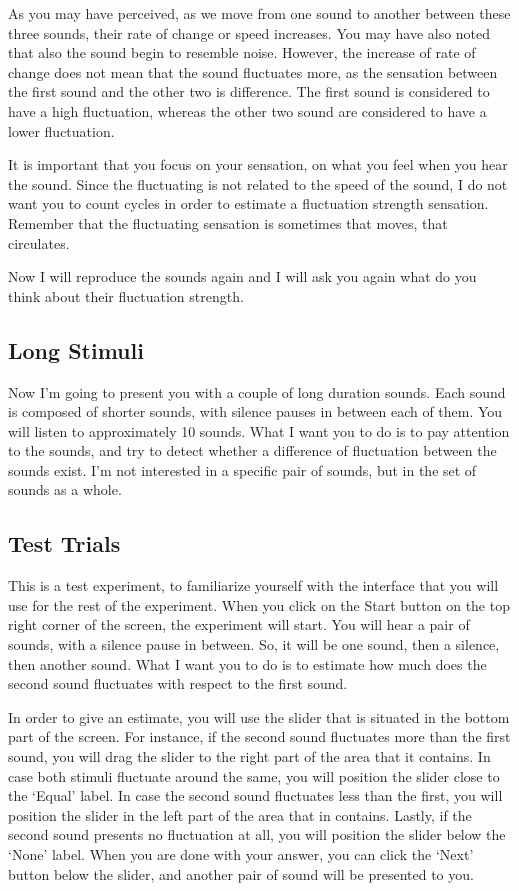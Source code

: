 \documentclass[../main.tex]{subfiles}
\begin{document}
As you may have perceived, as we move from one sound to another between these
three sounds, their rate of change or speed increases. You may have also noted
that also the sound begin to resemble noise. However, the increase of rate of
change does not mean that the sound fluctuates more, as the sensation between
the first sound and the other two is difference. The first sound is considered
to have a high fluctuation, whereas the other two sound are considered to have
a lower fluctuation.

It is important that you focus on your sensation, on what you feel when you
hear the sound. Since the fluctuating is not related to the speed of the sound,
I do not want you to count cycles in order to estimate a fluctuation strength
sensation. Remember that the fluctuating sensation is sometimes that moves, that
circulates.

Now I will reproduce the sounds again and I will ask you again what do you think
about their fluctuation strength.

\subsection{Long Stimuli}
\label{sub:long_stimuli}

Now I'm going to present you with a couple of long duration sounds. Each sound
is composed of shorter sounds, with silence pauses in between each of them. You
will listen to approximately 10 sounds. What I want you to do is to pay
attention to the sounds, and try to detect whether a difference of fluctuation
between the sounds exist. I'm not interested in a specific pair of sounds, but
in the set of sounds as a whole.

\subsection{Test Trials}
\label{sub:test_trials}

This is a test experiment, to familiarize yourself with the interface that you
will use for the rest of the experiment. When you click on the Start button
on the top right corner of the screen, the experiment will start. You will
hear a pair of sounds, with a silence pause in between. So, it will be one
sound, then a silence, then another sound. What I want you to do is to estimate
how much does the second sound fluctuates with respect to the first sound.

In order to give an estimate, you will use the slider that is situated in the
bottom part of the screen. For instance, if the second sound fluctuates more
than the first sound, you will drag the slider to the right part of the area
that it contains. In case both stimuli fluctuate around the same, you will
position the slider close to the `Equal' label. In case the second sound
fluctuates less than the first, you will position the slider in the left part
of the area that in contains. Lastly, if the second sound presents no
fluctuation at all, you will position the slider below the `None' label. When
you are done with your answer, you can click the `Next' button below the slider,
and another pair of sound will be presented to you.
\end{document}
